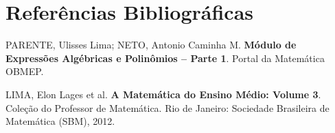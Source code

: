 \documentclass[12pt,a4paper]{article}
\begin{document}
\section*{Referências Bibliográficas}
\begin{enumerate}[label={[\arabic*]},leftmargin=*]
    \item PARENTE, Ulisses Lima; NETO, Antonio Caminha M. \textbf{Módulo de Expressões Algébricas e Polinômios -- Parte 1}. Portal da Matemática OBMEP.
    \item LIMA, Elon Lages et al. \textbf{A Matemática do Ensino Médio: Volume 3}. Coleção do Professor de Matemática. Rio de Janeiro: Sociedade Brasileira de Matemática (SBM), 2012.
\end{enumerate}
\end{document}
